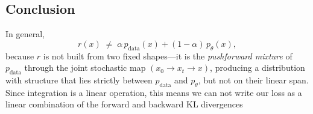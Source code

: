 \documentclass{article}
\begin{document}
\subsection*{Conclusion}
In general,
\[
r(x) \;\neq\; \alpha\,p_{\text{data}}(x) + (1-\alpha)\,p_\theta(x),
\]
because $r$ is not built from two fixed shapes—it is the \emph{pushforward mixture} of $p_{\text{data}}$
through the joint stochastic map $(x_0 \!\to\! x_t \!\to\! x)$,
producing a distribution with structure that lies strictly between $p_{\text{data}}$ and $p_\theta$,
but not on their linear span. Since integration is a linear operation, this means we can not write our loss as a linear combination of the forward and backward KL divergences
\end{document}
